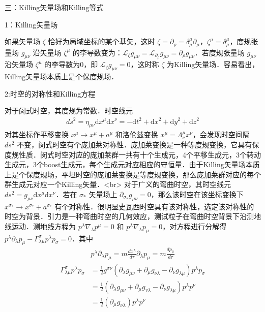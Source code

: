 三：Killing矢量场和Killing等式

1：Killing矢量场

如果矢量场 $\zeta$ 恰好为局域坐标的某个基矢，这时 $\zeta=\partial_{\rho}=\delta_{\rho}^{\mu} \partial_{\mu}$，$\zeta^{\mu}=\delta_{\rho}^{\mu}$，度规张量场 $g_{\mu \nu}$ 沿矢量场 $\zeta^{\mu}$ 的李导数变为：$\mathcal{L}_{\zeta} g_{\mu \nu} =\mathcal{L}_{\partial_{\rho}} g_{\mu \nu}=\partial_{\rho} g_{\mu \nu}$．若度规张量场 $g_{\mu \nu}$ 沿矢量场 $\zeta^{\mu}$ 的李导数为0，即 $\mathcal{L}_{\zeta} g_{\mu \nu} =0$，这时称 $\zeta$ 为Killing矢量场．容易看出，Killing矢量场本质上是个保度规场．

2:时空的对称性和Killing方程

对于闵式时空，其度规为常数．时空线元$$\begin{aligned}
d s^{2}=\eta_{\mu \nu} \mathrm{d} x^{\mu} \mathrm{d} x^{\nu}=-\mathrm{d} t^{2}+\mathrm{d} x^{2}+\mathrm{d} y^{2}+\mathrm{d} z^{2}
\end{aligned}$$对其坐标作平移变换 $x^{\mu}\rightarrow x^{\mu}+a^{\mu}$ 和洛伦兹变换 $x^{\mu}=\Lambda^{\mu}_{\nu} x^{\nu}$，会发现时空间隔 $d s^{2}$ 不变，闵式时空有个庞加莱对称性．庞加莱变换是一种等度规变换，它具有保度规性质．闵式时空对应的庞加莱群一共有十个生成元，4个平移生成元，3个转动生成元，3个boost生成元，每个生成元对应相应的守恒量．由于Killing矢量场本质上是个保度规场，平坦时空的庞加莱变换是等度规变换，那么庞加莱群对应的每个群生成元对应一个Killing矢量．<br>
对于广义的弯曲时空，其时空线元 $d s^{2}=g_{\mu \nu} \mathrm{d} x^{\mu} \mathrm{d} x^{\nu}$．若在 $\sigma_{*}$ 矢量场上 $\partial_{\sigma_{*}} g_{\mu \nu}=0$，那么该时空在该坐标变换下 $x^{\sigma_{*}} \rightarrow x^{\sigma_{*}}+a^{\sigma_{*}}$ 有个对称性．很明显史瓦西时空具有该对称性，选定该对称性的时空为背景．引力是一种弯曲时空的几何效应，测试粒子在弯曲时空背景下沿测地线运动．测地线方程为 $p^{\lambda} \nabla_{\lambda} p^{\mu}=0$ 和 $p^{\lambda} \nabla_{\lambda} p_{\mu}=0$，对方程进行分解得 $p^{\lambda} \partial_{\lambda} p_{\mu}-\Gamma_{\lambda \mu}^{\sigma} p^{\lambda} p_{\sigma}=0$．其中$$\begin{aligned}
p^{\lambda} \partial_{\lambda} p_{\mu}=m \frac{d x^{\lambda}}{d \tau} \partial_{\lambda} p_{\mu}=m \frac{d p_{\mu}}{d \tau}\end{aligned}$$
$$\begin{aligned}
\Gamma_{\lambda \mu}^{\sigma} p^{\lambda} p_{\sigma} &=\frac{1}{2} g^{\sigma \nu}\left(\partial_{\lambda} g_{\mu \nu}+\partial_{\mu} g_{\nu\lambda}-\partial_{\nu} g_{\lambda \mu}\right) p^{\lambda} p_{\sigma} \\
&=\frac{1}{2}\left(\partial_{\lambda} g_{\mu \nu}+\partial_{\mu} g_{v \lambda}-\partial_{\nu} g_{\lambda \mu}\right) p^{\lambda} p^{\nu} \\
&=\frac{1}{2}\left(\partial_{\mu} g_{\nu \lambda}\right) p^{\lambda} p^{\nu}
\end{aligned}$$
